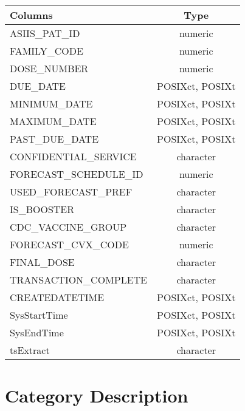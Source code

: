 \documentclass[
  letterpaper,
  DIV=11,
  numbers=noendperiod]{scrreprt}
\begin{document}
\begin{longtable}{lc}
\toprule
Columns & Type \\ 
\midrule
ASIIS\_PAT\_ID & numeric \\ 
FAMILY\_CODE & numeric \\ 
DOSE\_NUMBER & numeric \\ 
DUE\_DATE & POSIXct, POSIXt \\ 
MINIMUM\_DATE & POSIXct, POSIXt \\ 
MAXIMUM\_DATE & POSIXct, POSIXt \\ 
PAST\_DUE\_DATE & POSIXct, POSIXt \\ 
CONFIDENTIAL\_SERVICE & character \\ 
FORECAST\_SCHEDULE\_ID & numeric \\ 
USED\_FORECAST\_PREF & character \\ 
IS\_BOOSTER & character \\ 
CDC\_VACCINE\_GROUP & character \\ 
FORECAST\_CVX\_CODE & numeric \\ 
FINAL\_DOSE & character \\ 
TRANSACTION\_COMPLETE & character \\ 
CREATEDATETIME & POSIXct, POSIXt \\ 
SysStartTime & POSIXct, POSIXt \\ 
SysEndTime & POSIXct, POSIXt \\ 
tsExtract & character \\ 
\bottomrule
\end{longtable}

\hypertarget{category-description-43}{%
\section*{Category Description}\label{category-description-43}}
\end{document}

